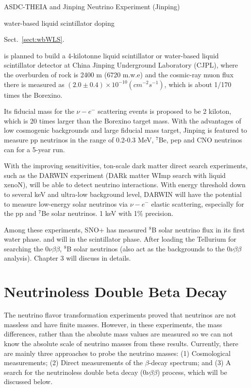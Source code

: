 ASDC-THEIA and Jinping Neutrino Experiment (Jinping)\cite{beacom2017physics}

water-based liquid scintillator 
doping

Sect.~\ref{sect:wbWLS}.


is planned to build a 4-kilotonne liquid scintillator or water-based liquid scintillator detector at China Jinping Underground Laboratory (CJPL), where the overburden of rock is 2400 m (6720 m.w.e) and the cosmic-ray muon flux there is measured as $(2.0\pm0.4)\times10^{-10}(cm^{-2}s^{-1})$\cite{beacom2017physics}, which is about 1/170 times the Borexino\cite{bellini2012cosmic}.

Its fiducial mass for the $\nu-e^-$ scattering events is proposed to be 2 kiloton, which is 20 times larger than the Borexino target mass. With the advantages of low cosmogenic backgrounds and large fiducial mass target, Jinping is featured to measure pp neutrinos in the range of 0.2-0.3 MeV, $^7$Be, pep and CNO neutrinos
can for a 5-year run\cite{beacom2017physics}. 

With the improving sensitivities, ton-scale dark matter direct search experiments, such as the DARWIN experiment (DARk matter WImp search with liquid xenoN), will be able to detect neutrino interactions\cite{aalbers2016darwin}. With energy threshold down to several keV and ultra-low background level, DARWIN will have the potential to measure low-energy solar neutrinos via $\nu-e^-$ elastic scattering, especially for the pp and $^7$Be solar neutrinos. 1 keV with 1\% precision\cite{baudis2014neutrino,aalbers2020solar}.

Among these experiments, SNO+ has measured $^8$B solar neutrino flux in its first water phase. 
and will in the scintillator phase.
After loading the Tellurium for searching the $0\nu\beta\beta$,  $^8$B solar neutrinos
(also act as the backgrounds to the $0\nu\beta\beta$ analysis). Chapter 3 will discuss in details.

\section{Neutrinoless Double Beta Decay}\label{sect:doublebeta}
The neutrino flavor transformation experiments proved that neutrinos are not massless and have finite masses. However, in these experiments, the mass differences, rather than the absolute mass values are measured so we can not know the absolute scale of neutrino masses from these results. Currently, there are mainly three approaches to probe the neutrino masses\cite{valle2015neutrinos}: (1) Cosmological measurements\cite{aghanim2020planck,dvorkin2019neutrino,lesgourgues2013neutrino}; (2) Direct measurements of the $\beta$-decay spectrum; and (3) A search for the neutrinoless double beta decay ($0\nu\beta\beta$) process, which will be discussed below.

